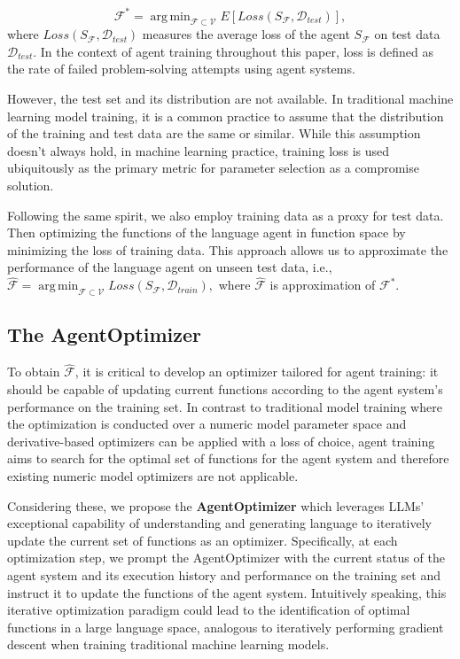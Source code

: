 \documentclass{article}
\theoremstyle{plain}
\theoremstyle{definition}
\theoremstyle{remark}
\DeclareMathOperator*{\argmin}{arg\,min}
\begin{document}
\begin{equation}
\label{eq:final_goal}
\mathcal{F^{*}} = \argmin_{\mathcal{F}\subset\mathcal{V}}E[Loss(S_{\mathcal{F}}, \mathcal{D}_{test})],
\end{equation}
where $Loss(S_{\mathcal{F}}, \mathcal{D}_{test})$ measures the average loss of the agent $S_{\mathcal{F}}$ on test data $\mathcal{D}_{test}$.  
In the context of agent training throughout this paper, loss is defined as the rate of failed problem-solving attempts using agent systems.

However, the test set and its distribution are not available. In traditional machine learning model training, it is a common practice to assume that the distribution of the training and test data are the same or similar. 
While this assumption doesn’t always hold, in machine learning practice, training loss is used ubiquitously as the primary metric for parameter selection as a compromise solution.

Following the same spirit, we also employ training data as a proxy for test data. Then optimizing the functions of the language agent in function space by minimizing the loss of training data. This approach allows us to approximate the performance of the language agent on unseen test data, i.e.,
$
\hat{\mathcal{F}} = \argmin_{\mathcal{F}\subset\mathcal{V}}Loss(S_{\mathcal{F}}, \mathcal{D}_{train}),
$
where $\hat{\mathcal{F}}$ is approximation of $\mathcal{F^{*}}$. 


\subsection{The AgentOptimizer}

To obtain $\hat{\mathcal{F}}$, it is critical to develop an optimizer tailored for agent training: it should be capable of updating current functions according to the agent system's performance on the training set. In contrast to traditional model training where the optimization is conducted over a numeric model parameter space and derivative-based optimizers can be applied with a loss of choice, agent training aims to search for the optimal set of functions for the agent system and therefore existing numeric model optimizers are not applicable.

Considering these, we propose the \textbf{AgentOptimizer} which leverages LLMs' exceptional capability of understanding and generating language to iteratively update the current set of functions as an optimizer.
Specifically, at each optimization step, we prompt the AgentOptimizer with the current status of the agent system and its execution history and performance on the training set and instruct it to update the functions of the agent system.
Intuitively speaking, this iterative optimization paradigm could lead to the identification of optimal functions in a large language space, analogous to iteratively performing gradient descent when training traditional machine learning models.
\end{document}
